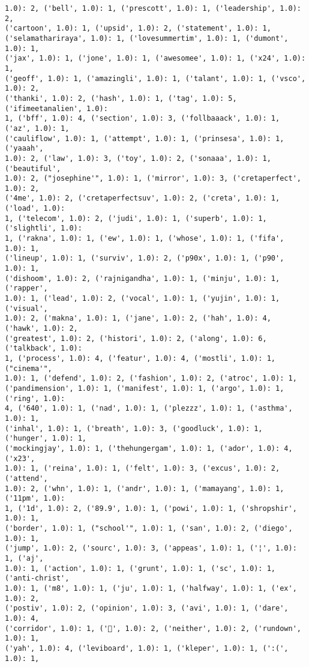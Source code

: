 \documentclass[11pt]{article}
\begin{document}
\begin{Verbatim}[commandchars=\\\{\}]
1.0): 2, ('bell', 1.0): 1, ('prescott', 1.0): 1, ('leadership', 1.0): 2,
('cartoon', 1.0): 1, ('upsid', 1.0): 2, ('statement', 1.0): 1,
('selamathariraya', 1.0): 1, ('lovesummertim', 1.0): 1, ('dumont', 1.0): 1,
('jax', 1.0): 1, ('jone', 1.0): 1, ('awesomee', 1.0): 1, ('x24', 1.0): 1,
('geoff', 1.0): 1, ('amazingli', 1.0): 1, ('talant', 1.0): 1, ('vsco', 1.0): 2,
('thanki', 1.0): 2, ('hash', 1.0): 1, ('tag', 1.0): 5, ('ifimeetanalien', 1.0):
1, ('bff', 1.0): 4, ('section', 1.0): 3, ('follbaaack', 1.0): 1, ('az', 1.0): 1,
('cauliflow', 1.0): 1, ('attempt', 1.0): 1, ('prinsesa', 1.0): 1, ('yaaah',
1.0): 2, ('law', 1.0): 3, ('toy', 1.0): 2, ('sonaaa', 1.0): 1, ('beautiful',
1.0): 2, ("josephine'", 1.0): 1, ('mirror', 1.0): 3, ('cretaperfect', 1.0): 2,
('4me', 1.0): 2, ('cretaperfectsuv', 1.0): 2, ('creta', 1.0): 1, ('load', 1.0):
1, ('telecom', 1.0): 2, ('judi', 1.0): 1, ('superb', 1.0): 1, ('slightli', 1.0):
1, ('rakna', 1.0): 1, ('ew', 1.0): 1, ('whose', 1.0): 1, ('fifa', 1.0): 1,
('lineup', 1.0): 1, ('surviv', 1.0): 2, ('p90x', 1.0): 1, ('p90', 1.0): 1,
('dishoom', 1.0): 2, ('rajnigandha', 1.0): 1, ('minju', 1.0): 1, ('rapper',
1.0): 1, ('lead', 1.0): 2, ('vocal', 1.0): 1, ('yujin', 1.0): 1, ('visual',
1.0): 2, ('makna', 1.0): 1, ('jane', 1.0): 2, ('hah', 1.0): 4, ('hawk', 1.0): 2,
('greatest', 1.0): 2, ('histori', 1.0): 2, ('along', 1.0): 6, ('talkback', 1.0):
1, ('process', 1.0): 4, ('featur', 1.0): 4, ('mostli', 1.0): 1, ("cinema'",
1.0): 1, ('defend', 1.0): 2, ('fashion', 1.0): 2, ('atroc', 1.0): 1,
('pandimension', 1.0): 1, ('manifest', 1.0): 1, ('argo', 1.0): 1, ('ring', 1.0):
4, ('640', 1.0): 1, ('nad', 1.0): 1, ('plezzz', 1.0): 1, ('asthma', 1.0): 1,
('inhal', 1.0): 1, ('breath', 1.0): 3, ('goodluck', 1.0): 1, ('hunger', 1.0): 1,
('mockingjay', 1.0): 1, ('thehungergam', 1.0): 1, ('ador', 1.0): 4, ('x23',
1.0): 1, ('reina', 1.0): 1, ('felt', 1.0): 3, ('excus', 1.0): 2, ('attend',
1.0): 2, ('whn', 1.0): 1, ('andr', 1.0): 1, ('mamayang', 1.0): 1, ('11pm', 1.0):
1, ('1d', 1.0): 2, ('89.9', 1.0): 1, ('powi', 1.0): 1, ('shropshir', 1.0): 1,
('border', 1.0): 1, ("school'", 1.0): 1, ('san', 1.0): 2, ('diego', 1.0): 1,
('jump', 1.0): 2, ('sourc', 1.0): 3, ('appeas', 1.0): 1, ('¦', 1.0): 1, ('aj',
1.0): 1, ('action', 1.0): 1, ('grunt', 1.0): 1, ('sc', 1.0): 1, ('anti-christ',
1.0): 1, ('m8', 1.0): 1, ('ju', 1.0): 1, ('halfway', 1.0): 1, ('ex', 1.0): 2,
('postiv', 1.0): 2, ('opinion', 1.0): 3, ('avi', 1.0): 1, ('dare', 1.0): 4,
('corridor', 1.0): 1, ('👯', 1.0): 2, ('neither', 1.0): 2, ('rundown', 1.0): 1,
('yah', 1.0): 4, ('leviboard', 1.0): 1, ('kleper', 1.0): 1, (':(', 1.0): 1,

\end{Verbatim}
\end{document}
